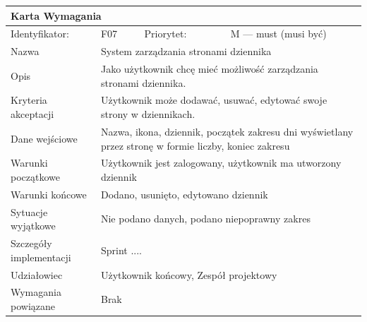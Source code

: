 \documentclass[a4paper,11pt]{report}
\begin{document}
		\begin{tabular}{|p{3cm}|p{2cm}|p{2cm}|p{6cm}|}
		\hline
		\multicolumn{4}{|p{12 cm}|}{Karta Wymagania}\\
		\hline
		Identyfikator: & F07 & Priorytet: & M — must (musi być)\\
		\hline
		Nazwa & \multicolumn{3}{|p{10 cm}|}{System zarządzania stronami dziennika}\\
		\hline
		Opis & \multicolumn{3}{|p{10 cm}|}{Jako użytkownik chcę mieć możliwość zarządzania stronami dziennika.}\\
		\hline
		Kryteria akceptacji & \multicolumn{3}{|p{10 cm}|}{Użytkownik może dodawać, usuwać, edytować swoje strony w dziennikach.}\\
		\hline
		Dane wejściowe & \multicolumn{3}{|p{10 cm}|}{Nazwa, ikona, dziennik, początek zakresu dni wyświetlany przez stronę w formie liczby, koniec zakresu}\\
		\hline
		Warunki początkowe & \multicolumn{3}{|p{10 cm}|}{Użytkownik jest zalogowany, użytkownik ma utworzony dziennik}\\
		\hline
		Warunki końcowe & \multicolumn{3}{|p{10 cm}|}{Dodano, usunięto, edytowano dziennik}\\
		\hline
		Sytuacje wyjątkowe & \multicolumn{3}{|p{10 cm}|}{Nie podano danych, podano niepoprawny zakres}\\
		\hline
		Szczegóły implementacji & \multicolumn{3}{|p{10 cm}|}{Sprint ....}\\
		\hline
		Udziałowiec & \multicolumn{3}{|p{10 cm}|}{Użytkownik końcowy, Zespół projektowy}\\
		\hline
		Wymagania powiązane & \multicolumn{3}{|p{10 cm}|}{Brak}\\
		\hline
		\end{tabular}\\
		\newline
		\vspace*{0,2 cm}
		\newline
\end{document}
